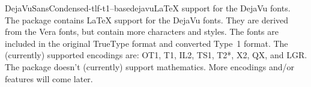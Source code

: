 \documentclass{ddltxtyp}
\begin{document}

\begin{package}{DejaVuSansCondensed-tlf-t1--base}{dejavu}{{\LaTeX} support for the DejaVu fonts.}
The package contains {\LaTeX} support for the DejaVu fonts. They
are derived from the Vera fonts, but contain more characters
and styles. The fonts are included in the original TrueType
format and converted Type~1 format. The (currently) supported
encodings are: OT1, T1, IL2, TS1, T2*, X2, QX, and LGR. The
package doesn't (currently) support mathematics. More encodings
and/or features will come later.
\end{package}


\end{document}
